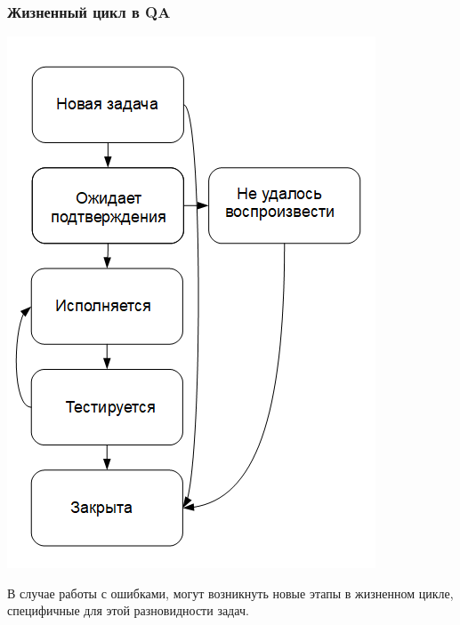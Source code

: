 \documentclass{../industrial-development}
\begin{document}
\begin{frame} \frametitle{Жизненный цикл в QA}
	\centerline{\includegraphics[height=0.9\textheight]{cyc6.png}}
\end{frame}
\lecturenotes
В случае работы с ошибками, могут возникнуть новые этапы в жизненном цикле, специфичные для этой разновидности задач.
\end{document}
